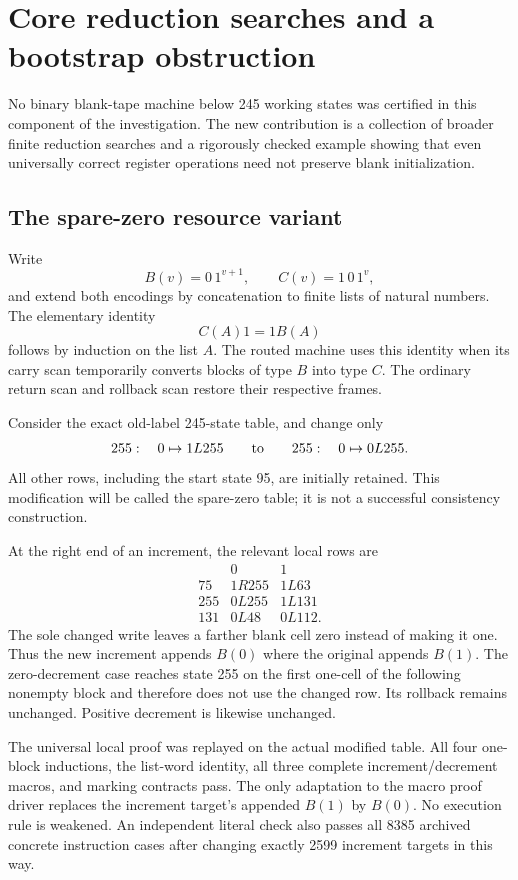 \section{Core reduction searches and a bootstrap obstruction}

No binary blank-tape machine below 245 working states was certified in this
component of the investigation. The new contribution is a collection of
broader finite reduction searches and a rigorously checked example showing
that even universally correct register operations need not preserve blank
initialization.

\subsection{The spare-zero resource variant}

Write
\[
 B(v)=0\,1^{v+1},\qquad C(v)=1\,0\,1^v,
\]
and extend both encodings by concatenation to finite lists of natural
numbers. The elementary identity
\[
 C(A)1=1 B(A)
\]
follows by induction on the list $A$. The routed machine uses this identity
when its carry scan temporarily converts blocks of type $B$ into type $C$.
The ordinary return scan and rollback scan restore their respective frames.

Consider the exact old-label 245-state table, and change only
\[
 255:\quad 0\mapsto 1 L 255
 \qquad\hbox{to}\qquad
 255:\quad 0\mapsto 0 L 255.
\]
All other rows, including the start state 95, are initially retained. This
modification will be called the spare-zero table; it is not a successful
consistency construction.

At the right end of an increment, the relevant local rows are
\[
\begin{array}{c|cc}
 &0&1\\\hline
 75&1 R 255&1 L 63\\
 255&0 L 255&1 L 131\\
 131&0 L 48&0 L 112.
\end{array}
\]
The sole changed write leaves a farther blank cell zero instead of making
it one. Thus the new increment appends $B(0)$ where the original appends
$B(1)$. The zero-decrement case reaches state 255 on the first one-cell of
the following nonempty block and therefore does not use the changed row.
Its rollback remains unchanged. Positive decrement is likewise unchanged.

The universal local proof was replayed on the actual modified table. All
four one-block inductions, the list-word identity, all three complete
increment/decrement macros, and marking contracts pass. The only adaptation
to the macro proof driver replaces the increment target's appended $B(1)$
by $B(0)$. No execution rule is weakened. An independent literal check also
passes all 8385 archived concrete instruction cases after changing exactly
2599 increment targets in this way.

